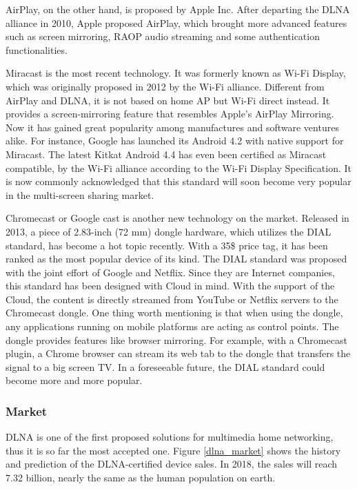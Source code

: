 AirPlay, on the other hand, is proposed by Apple Inc. After departing the DLNA alliance in 2010, Apple proposed AirPlay, which brought more advanced features such as screen mirroring, RAOP audio streaming and some authentication functionalities.

Miracast is the most recent technology. It was formerly known as Wi-Fi Display,
which was originally proposed in 2012 by the Wi-Fi alliance. Different from
AirPlay and DLNA, it is not based on home AP but Wi-Fi direct instead. It
provides a screen-mirroring feature that resembles Apple's AirPlay Mirroring.
Now it has gained great popularity among manufactures and software ventures
alike. For instance, Google has launched its Android 4.2 with native support
for Miracast. The latest Kitkat Android 4.4 has even been certified as Miracast
compatible, by the Wi-Fi alliance according to the Wi-Fi Display Specification.
It is now commonly acknowledged that this standard will soon become very
popular in the multi-screen sharing market.

Chromecast or Google cast is another new technology on the market. Released in
2013, a piece of 2.83-inch (72 mm) dongle hardware, which utilizes the DIAL
standard, has become a hot topic recently. With a 35\$ price tag, it has been
ranked as the most popular device of its kind. The DIAL standard was proposed
with the joint effort of Google and Netflix. Since they are Internet companies,
this standard has been designed with Cloud in mind. With the support of the
Cloud, the content is directly streamed from YouTube or Netflix servers to the
Chromecast dongle. One thing worth mentioning is that when using the dongle,
any applications running on mobile platforms are acting as control points. The
dongle provides features like browser mirroring. For example, with a Chromecast
plugin, a Chrome browser can stream its web tab to the dongle that transfers
the signal to a big screen TV. In a foreseeable future, the DIAL standard could
become more and more popular.
\subsubsection{Market\label{2_3_2}} 
DLNA is one of the first proposed solutions for multimedia home 
networking, thus it is so far the most accepted one. Figure 
\ref{dlna_market} shows the history and prediction of the DLNA-certified device sales. In 2018, the 
sales will reach 7.32 billion, nearly the same as the human population on earth.

